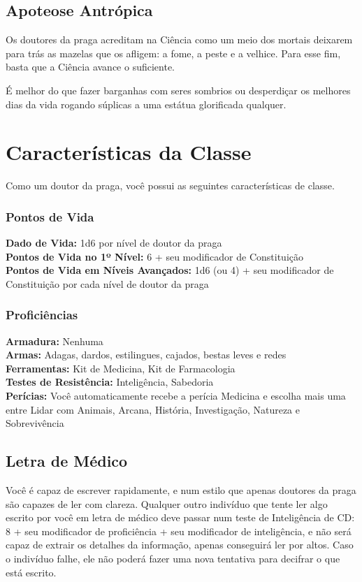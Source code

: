 \documentclass[letterpaper,twocolumn,openany]{dndbook}
\begin{document}
	\subsection{Apoteose Antrópica}
	Os doutores da praga acreditam na Ciência como um meio dos mortais deixarem para trás as mazelas que os afligem: a fome, a peste e a velhice. Para esse fim, basta que a Ciência avance o suficiente.
	
	É melhor do que fazer barganhas com seres sombrios ou desperdiçar os melhores dias da vida rogando súplicas a uma estátua glorificada qualquer.
	
	\section{Características da Classe}
	Como um doutor da praga, você possui as seguintes características de classe.
	
	\subsubsection{Pontos de Vida}
	\noindent\textbf{Dado de Vida:} 1d6 por nível de doutor da praga \\
	\noindent\textbf{Pontos de Vida no 1º Nível:} 6 + seu modificador de Constituição \\
	\noindent\textbf{Pontos de Vida em Níveis Avançados:} 1d6 (ou 4) + seu modificador de Constituição por cada nível de doutor da praga \\
	
	\subsubsection{Proficiências}
	\noindent\textbf{Armadura:} Nenhuma \\
	\noindent\textbf{Armas:} Adagas, dardos, estilingues, cajados, bestas leves e redes \\
	\noindent\textbf{Ferramentas:} Kit de Medicina, Kit de Farmacologia \\
	\noindent\textbf{Testes de Resistência:} Inteligência, Sabedoria \\
	\noindent\textbf{Perícias:} Você automaticamente recebe a perícia Medicina e escolha mais uma entre Lidar com Animais, Arcana, História, Investigação, Natureza e Sobrevivência \\
	
	\subsection{Letra de Médico}
	Você é capaz de escrever rapidamente, e num estilo que apenas doutores da praga são capazes de ler com clareza. Qualquer outro indivíduo que tente ler algo escrito por você em letra de médico deve passar num teste de Inteligência de CD: 8 + seu modificador de proficiência + seu modificador de inteligência, e não será capaz de extrair os detalhes da informação, apenas conseguirá ler por altos.
	Caso o indivíduo falhe, ele não poderá fazer uma nova tentativa para decifrar o que está escrito.
	
\end{document}
